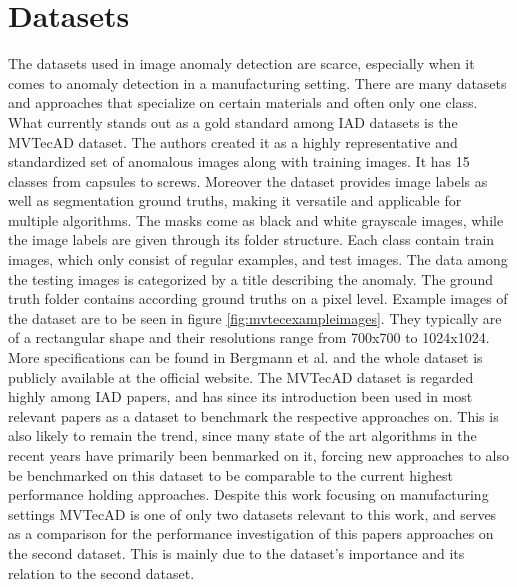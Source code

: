 \section{Datasets}
\label{sec:datasets}
The datasets used in image anomaly detection are scarce, especially when it comes to anomaly detection in a manufacturing setting. There are many datasets and approaches that specialize on certain materials \cite{FabricDataset_Tsang_2016} 
\cite{SteeltubeDataset_Yang_2021} \cite{magnetictiles_Huang_2018}
and often only one class. What currently stands out as a gold standard among IAD datasets is the MVTecAD \cite{MVTEC_Bergmann_2021} dataset. The authors created it  
as a highly representative and standardized set of anomalous images along with training images. It has 15 classes from capsules to screws. Moreover the dataset provides image labels as well as segmentation 
ground truths, making it versatile and applicable for multiple algorithms. The masks come as black and white grayscale images, while the image labels are given through its folder structure. 
Each class contain train images, which only consist of regular examples, 
and test images. The data among the testing images is categorized by a title describing the anomaly. The ground truth folder contains 
according ground truths on a pixel level.\newline
Example images of the dataset are to be seen in figure \ref{fig:mvtecexampleimages}. They typically are of a rectangular shape and their resolutions range from 
700x700 to 1024x1024. More specifications can be found in Bergmann et al. \cite{MVTEC_Bergmann_2021} and the whole dataset is publicly available at the official website\cite{mvtecdownload}.\newline
The MVTecAD\cite{MVTEC_Bergmann_2021} dataset is regarded highly among IAD papers, and has since its introduction been used in most relevant papers as a dataset 
to benchmark the respective approaches on. This is also likely to remain the trend, since many state of the art algorithms in the recent years have primarily been benmarked on it, forcing new approaches 
to also be benchmarked on this dataset to be comparable to the current highest performance holding approaches. Despite this work focusing on manufacturing settings MVTecAD is one of only two datasets relevant to this work, 
and serves as a comparison for the performance investigation of this papers approaches on the second dataset. This is mainly due to the dataset's importance and 
its relation to the second dataset.



